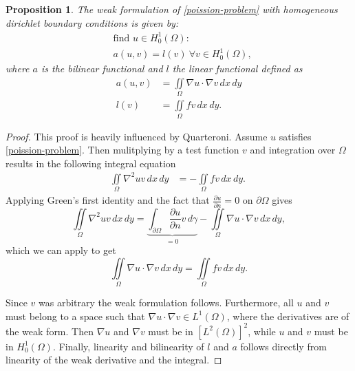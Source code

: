 \documentclass[11pt,a4paper,english]{elsarticle}%
\newtheorem{proposition}[theorem]{Proposition}
\begin{document}
\begin{proposition}
    The weak formulation of \eqref{poission-problem} with homogeneous dirichlet boundary conditions is given by:  
    \begin{equation*}
        \begin{aligned}
        &\text{find } u \in H_0^{1}(\Omega) : 
        \\
        &a(u,v) = l(v) \ \forall v \in H_0^{1}(\Omega), 
        \end{aligned}
    \end{equation*}
    where $a$ is the bilinear functional and $l$ the linear functional defined as 
    \begin{equation*}
        \begin{aligned}
            a(u,v) &= \iint\limits_{\Omega} \nabla u \cdot \nabla v \, dx \, dy
            \\
            l(v) &= \iint\limits_{\Omega} fv \, dx \, dy.
        \end{aligned}
    \end{equation*}
\end{proposition}
\begin{proof}
    This proof is heavily influenced by Quarteroni\cite[p. 44-45]{AQuart}.
    Assume $u$ satisfies \eqref{poission-problem}. Then mulitplying by a test function $v$ and integration over $\Omega$ results in the following integral equation
    \begin{equation}
        \label{weak-start}
        \begin{aligned}
            \iint\limits_{\Omega} \nabla^2uv \, dx \, dy &=  -\iint\limits_{\Omega} fv \, dx \, dy.\ 
        \end{aligned}
    \end{equation}
    Applying Green's first identity and the fact that $\frac{\partial u}{\partial n} = 0$ on $\partial \Omega$ gives
    \begin{equation}
        \iint\limits_{\Omega} \nabla^2 u v \, dx \, dy 
        = \underbrace{\int_{\partial \Omega} \frac{\partial u}{\partial n} v \, d\gamma}_{=0} - \iint\limits_{\Omega} \nabla u \cdot \nabla v  \, dx \, dy,
        \label{greens-identety}
    \end{equation}
    which we can apply to get 
    \begin{equation}
        \iint\limits_{\Omega} \nabla u \cdot \nabla v \, dx \, dy = 
        \iint\limits_{\Omega} fv \, dx \, dy.
    \end{equation}
    
    Since $v$ was arbitrary the weak formulation follows. Furthermore, all $u$ and $v$ must belong to a space such that $\nabla u \cdot \nabla v \in {L^1}(\Omega)$, where the derivatives are of the weak form. Then $\nabla u$ and $\nabla v$ must be in $\left[{L^2}(\Omega)\right]^2$, while $u$ and $v$ must be in ${H^1_0}(\Omega)$. Finally, linearity and bilinearity of $l$ and $a$ follows directly from linearity of the weak derivative and the integral.
\end{proof}
\end{document}
